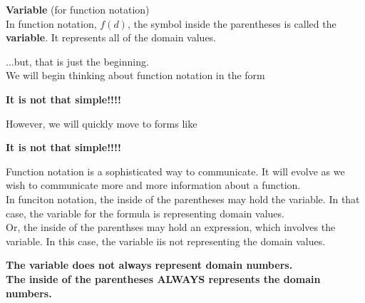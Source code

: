 \documentclass{ximera}
\begin{document}
\begin{definition}  \textbf{\textcolor{green!50!black}{Variable}} (for function notation) \\ 


In function notation, $f(d)$, the symbol inside the parentheses is called the \textbf{variable}. It represents all of the domain values.

\end{definition}



...but, that is just the beginning. \\









We will begin thinking about function notation in the form 

\begin{center}

\textbf{\textcolor{red!80!black}{It is not that simple!!!!}}

\end{center}


However, we will quickly move to forms like


\begin{center}

\textbf{\textcolor{red!80!black}{It is not that simple!!!!}}

\end{center}




Function notation is a sophisticated way to communicate.  It will evolve as we wish to communicate more and more information about a function. \\

In funciton notation, the inside of the parentheses may hold the variable.  In that case, the variable for the formula is representing domain values. \\

Or, the inside of the parenthses may hold an expression, which involves the variable.  In this case, the variable iis not representing the domain values. \\


 
\begin{center}

\textbf{\textcolor{blue!55!black}{The variable does not always represent domain numbers.}} \\

\textbf{\textcolor{purple!85!blue}{The inside of the parentheses ALWAYS represents the domain numbers.}}


\end{center}
\end{document}
